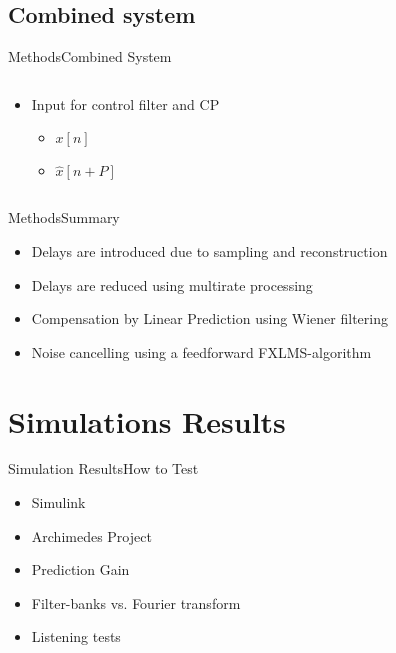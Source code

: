 \subsection{Combined system}
\begin{frame}{Methods}{Combined System}	
\begin{columns}
	\begin{column}{0.4\textwidth}
		\begin{itemize}
			\item Input for control filter and CP
			\vspace{-4mm}
			\begin{itemize}
			\item $x[n]$
			\item $\hat{x}[n+P]$
			\end{itemize}
		\end{itemize}
	\end{column}
	\begin{column}{0.6\textwidth} 
		\resizebox{0.9\columnwidth}{!}{		
			}
	\end{column}
\end{columns}
\end{frame}





\begin{frame}{Methods}{Summary}	
\begin{itemize}
	\item Delays are introduced due to sampling and reconstruction
	\item Delays are reduced using multirate processing
	\item Compensation by Linear Prediction using Wiener filtering
	\item Noise cancelling using a feedforward FXLMS-algorithm
\end{itemize}
\end{frame}










\section{Simulations Results}


\begin{frame}{Simulation Results}{How to Test}	
\begin{itemize}
	\item Simulink 
	\item Archimedes Project
	\item Prediction Gain
	\item Filter-banks vs. Fourier transform
	\item Listening tests			
\end{itemize}
\end{frame}

